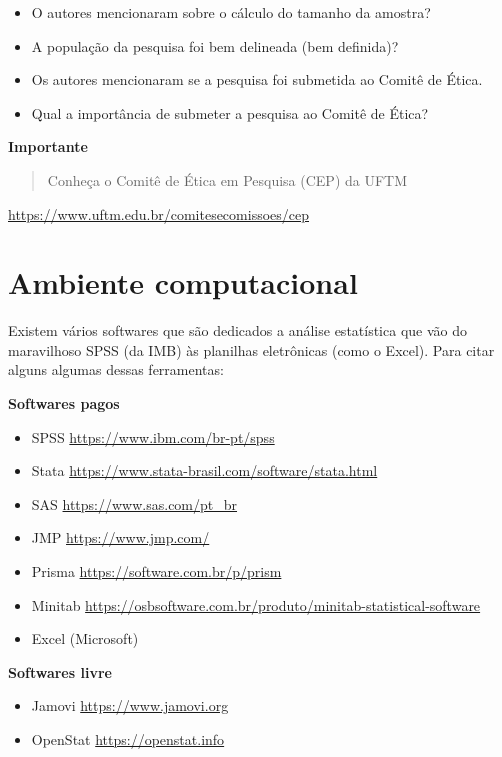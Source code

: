\documentclass[
]{book}
\begin{document}
\begin{itemize}
\item
  O autores mencionaram sobre o cálculo do tamanho da amostra?
\item
  A população da pesquisa foi bem delineada (bem definida)?
\item
  Os autores mencionaram se a pesquisa foi submetida ao Comitê de Ética.
\item
  Qual a importância de submeter a pesquisa ao Comitê de Ética?
\end{itemize}

\textbf{Importante}

\begin{quote}
Conheça o Comitê de Ética em Pesquisa (CEP) da UFTM
\end{quote}

\url{https://www.uftm.edu.br/comitesecomissoes/cep}

\hypertarget{ambiente-computacional}{%
\chapter{Ambiente computacional}\label{ambiente-computacional}}

Existem vários softwares que são dedicados a análise estatística que vão do maravilhoso SPSS (da IMB) às planilhas eletrônicas (como o Excel). Para citar alguns algumas dessas ferramentas:

\textbf{Softwares pagos}

\begin{itemize}
\item
  SPSS \url{https://www.ibm.com/br-pt/spss}
\item
  Stata \url{https://www.stata-brasil.com/software/stata.html}
\item
  SAS \url{https://www.sas.com/pt_br}
\item
  JMP \url{https://www.jmp.com/}
\item
  Prisma \url{https://software.com.br/p/prism}
\item
  Minitab \url{https://osbsoftware.com.br/produto/minitab-statistical-software}
\item
  Excel (Microsoft)
\end{itemize}

\textbf{Softwares livre}

\begin{itemize}
\item
  Jamovi \url{https://www.jamovi.org}
\item
  OpenStat \url{https://openstat.info}
\end{itemize}
\end{document}
